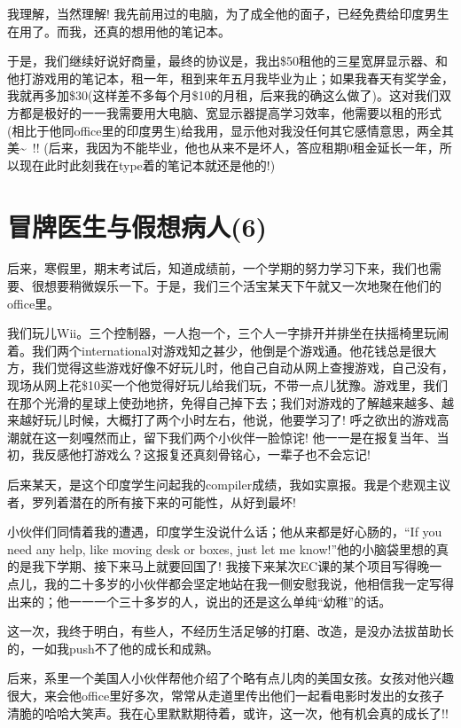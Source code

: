 \documentclass[12pt]{book}
\begin{document}
我理解，当然理解! 我先前用过的电脑，为了成全他的面子，已经免费给印度男生在用了。而我，还真的想用他的笔记本。

于是，我们继续好说好商量，最终的协议是，我出\$50租他的三星宽屏显示器、和他打游戏用的笔记本，租一年，租到来年五月我毕业为止；如果我春天有奖学金，我就再多加\$30(这样差不多每个月\$10的月租，后来我的确这么做了)。这对我们双方都是极好的一一我需要用大电脑、宽显示器提高学习效率，他需要以租的形式(相比于他同office里的印度男生)给我用，显示他对我没任何其它感情意思，两全其美\textasciitilde{}~!! (后来，我因为不能毕业，他也从来不是坏人，答应租期0租金延长一年，所以现在此时此刻我在type着的笔记本就还是他的!)

\section{冒牌医生与假想病人(6)}
\label{sec-18-6}

后来，寒假里，期末考试后，知道成绩前，一个学期的努力学习下来，我们也需要、很想要稍微娱乐一下。于是，我们三个活宝某天下午就又一次地聚在他们的office里。

我们玩儿Wii。三个控制器，一人抱一个，三个人一字排开并排坐在扶摇椅里玩闹着。我们两个international对游戏知之甚少，他倒是个游戏通。他花钱总是很大方，我们觉得这些游戏好像不好玩儿时，他自己自动从网上查搜游戏，自己没有，现场从网上花\$10买一个他觉得好玩儿给我们玩，不带一点儿犹豫。游戏里，我们在那个光滑的星球上使劲地挤，免得自己掉下去；我们对游戏的了解越来越多、越来越好玩儿时候，大概打了两个小时左右，他说，他要学习了! 呼之欲出的游戏高潮就在这一刻嘎然而止，留下我们两个小伙伴一脸惊诧! 他一一是在报复当年、当初，我反感他打游戏么？这报复还真刻骨铭心，一辈子也不会忘记!

后来某天，是这个印度学生问起我的compiler成绩，我如实禀报。我是个悲观主议者，罗列着潜在的所有接下来的可能性，从好到最坏!

小伙伴们同情着我的遭遇，印度学生没说什么话；他从来都是好心肠的，“If you need any help, like moving desk or boxes, just let me know!”他的小脑袋里想的真的是我下学期、接下来马上就要回国了! 我接下来某次EC课的某个项目写得晚一点儿，我的二十多岁的小伙伴都会坚定地站在我一侧安慰我说，他相信我一定写得出来的；他一一一个三十多岁的人，说出的还是这么单纯“幼稚”的话。

这一次，我终于明白，有些人，不经历生活足够的打磨、改造，是没办法拔苗助长的，一如我push不了他的成长和成熟。

后来，系里一个美国人小伙伴帮他介绍了个略有点儿肉的美国女孩。女孩对他兴趣很大，来会他office里好多次，常常从走道里传出他们一起看电影时发出的女孩子清脆的哈哈大笑声。我在心里默默期待着，或许，这一次，他有机会真的成长了!!
\end{document}
